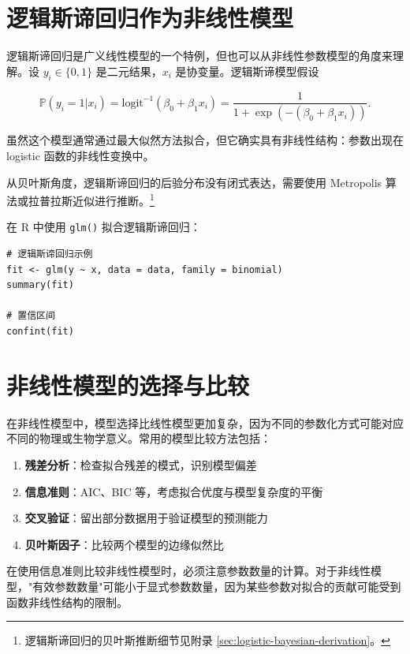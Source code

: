 \section{逻辑斯谛回归作为非线性模型}

逻辑斯谛回归是广义线性模型的一个特例，但也可以从非线性参数模型的角度来理解。设 $y_i \in \{0, 1\}$ 是二元结果，$x_i$ 是协变量。逻辑斯谛模型假设

\begin{equation}
\mathbb{P}(y_i = 1 | x_i) = \mathrm{logit}^{-1}(\beta_0 + \beta_1 x_i)
= \frac{1}{1 + \exp(-(\beta_0 + \beta_1 x_i))}. \label{eq:logistic-model}
\end{equation}

虽然这个模型通常通过最大似然方法拟合，但它确实具有非线性结构：参数出现在 logistic 函数的非线性变换中。

从贝叶斯角度，逻辑斯谛回归的后验分布没有闭式表达，需要使用 Metropolis 算法或拉普拉斯近似进行推断。\footnote{逻辑斯谛回归的贝叶斯推断细节见附录 \cref{sec:logistic-bayesian-derivation}。}

在 R 中使用 \texttt{glm()} 拟合逻辑斯谛回归：

\begin{verbatim}
# 逻辑斯谛回归示例
fit <- glm(y ~ x, data = data, family = binomial)
summary(fit)

# 置信区间
confint(fit)
\end{verbatim}

\section{非线性模型的选择与比较}

在非线性模型中，模型选择比线性模型更加复杂，因为不同的参数化方式可能对应不同的物理或生物学意义。常用的模型比较方法包括：

\begin{enumerate}
  \item \textbf{残差分析}：检查拟合残差的模式，识别模型偏差
  \item \textbf{信息准则}：AIC、BIC 等，考虑拟合优度与模型复杂度的平衡
  \item \textbf{交叉验证}：留出部分数据用于验证模型的预测能力
  \item \textbf{贝叶斯因子}：比较两个模型的边缘似然比
\end{enumerate}

\begin{Remark}
  在使用信息准则比较非线性模型时，必须注意参数数量的计算。对于非线性模型，"有效参数数量"可能小于显式参数数量，因为某些参数对拟合的贡献可能受到函数非线性结构的限制。
\end{Remark}

